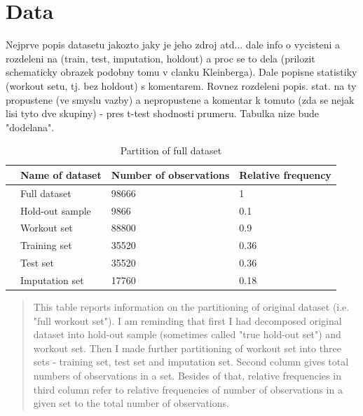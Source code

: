 \documentclass[12pt, twoside]{book} %
\begin{document}
\section{Data}     %

Nejprve popis datasetu jakozto jaky je jeho zdroj atd... dale info o vycisteni a  rozdeleni na (train, test, imputation, holdout) a proc se to dela (prilozit schematicky obrazek podobny tomu v clanku Kleinberga). Dale popisne statistiky (workout setu, tj. bez holdout) s komentarem. Rovnez rozdeleni popis. stat. na ty propustene (ve smyslu vazby) a nepropustene a komentar k tomuto (zda se nejak lisi tyto dve skupiny) -  pres t-test shodnosti prumeru. Tabulka nize bude "dodelana". 

\begin{table}[ht]
\centering
\begin{tabular}{rlll}
  \hline
 & Name of dataset & Number of observations & Relative frequency \\ 
  \hline
 & Full dataset & 98666 & 1 \\ 
  & Hold-out sample & 9866 & 0.1 \\ 
   & Workout set & 88800 & 0.9 \\ 
   & 	\hspace{1cm}Training set & 35520 & 0.36 \\ 
  & 	\hspace{1cm}Test set & 35520 & 0.36 \\ 
   &	\hspace{1cm}Imputation set & 17760 & 0.18 \\ 
   \hline
\end{tabular}

\caption{Partition of full dataset}
\medskip
{\small
\begin{quotation}
 This table reports information on the partitioning of original dataset (i.e. "full workout set"). I am reminding that first I had decomposed original dataset into hold-out sample (sometimes called "true hold-out set") and workout set. Then I made further partitioning of workout set into three sets - training set, test set and imputation set. Second column gives total numbers of observations in a set. Besides of that, relative frequencies in third column refer to relative frequencies of number of observations in a given set to the total number of observations. 
\end{quotation}
}

\end{table}
\end{document}
